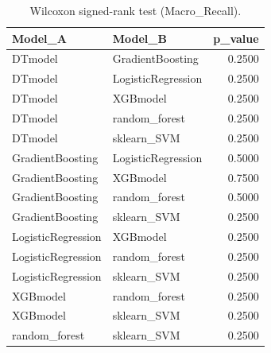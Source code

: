 \begin{table}[t]
\centering
\begin{tabular}{llr}
\toprule
Model_A & Model_B & p_value \\
\midrule
DTmodel & GradientBoosting & 0.2500 \\
DTmodel & LogisticRegression & 0.2500 \\
DTmodel & XGBmodel & 0.2500 \\
DTmodel & random_forest & 0.2500 \\
DTmodel & sklearn_SVM & 0.2500 \\
GradientBoosting & LogisticRegression & 0.5000 \\
GradientBoosting & XGBmodel & 0.7500 \\
GradientBoosting & random_forest & 0.5000 \\
GradientBoosting & sklearn_SVM & 0.2500 \\
LogisticRegression & XGBmodel & 0.2500 \\
LogisticRegression & random_forest & 0.2500 \\
LogisticRegression & sklearn_SVM & 0.2500 \\
XGBmodel & random_forest & 0.2500 \\
XGBmodel & sklearn_SVM & 0.2500 \\
random_forest & sklearn_SVM & 0.2500 \\
\bottomrule
\end{tabular}
\caption{Wilcoxon signed-rank test (Macro_Recall).}
\label{tab:wilcoxon_Macro_Recall}
\end{table}